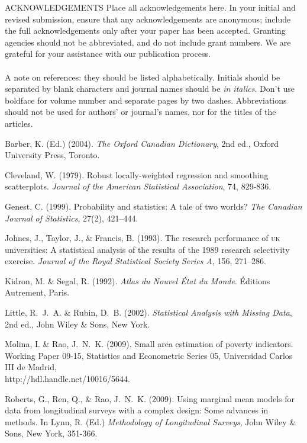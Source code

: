 \documentclass[12pt]{TD-CJS}
\begin{document}
\begin{ack}{ACKNOWLEDGEMENTS}
Place all acknowledgements here.  In your initial and revised submission, ensure that any acknowledgements are anonymous; include the full acknowledgements only after your paper has been accepted. Granting agencies should not be abbreviated, and do not include grant numbers.  We are grateful for your assistance with our publication process.\\
\\
A note on references: they should be listed alphabetically. Initials should be separated by blank characters and
journal names should be {\it in italics}. Don't use boldface for volume
number and separate pages by two dashes.
Abbreviations should not be used for authors' or journal's names, nor for the titles of the articles.
\end{ack}

\begin{thebibliography}{}
Barber, K. (Ed.) (2004). {\it The Oxford Canadian Dictionary}, 2nd ed., 
Oxford University Press, Toronto.

Cleveland, W. (1979). Robust locally-weighted regression and smoothing scatterplots. 
{\it Journal of the American Statistical Association}, 74, 829-836.

Genest, C. (1999). Probability and statistics: A tale of two worlds? 
{\it The Canadian Journal of Statistics}, 27(2), 421--444.

Johnes, J., Taylor, J., \& Francis, B. (1993). The research
performance of \textsc{uk} universities: A statistical analysis of the results
of the 1989 research selectivity exercise. {\it Journal of the Royal
Statistical Society Series A}, 156, 271--286.

Kidron, M. \& Segal, R. (1992). {\it Atlas du Nouvel \'Etat
du Monde}. \'Editions Autrement, Paris.

Little, R.~J.~A. \& Rubin, D.~B. (2002). {\it Statistical Analysis with Missing Data}, 2nd ed., 
John Wiley \& Sons, New York.

Molina, I. \& Rao, J.~N.~K. (2009). Small area estimation of poverty indicators. Working Paper 09-15, Statistics and Econometric Series 05, Universidad Carlos III de Madrid, \\http://hdl.handle.net/10016/5644.

Roberts, G., Ren, Q., \& Rao, J.~N.~K. (2009). 
Using marginal mean models for data from longitudinal surveys
with a complex design: Some advances in methods. In Lynn, R. (Ed.) {\it Methodology of Longitudinal Surveys}, 
John Wiley \& Sons, New York, 351-366.
\end{thebibliography}
\end{document}
